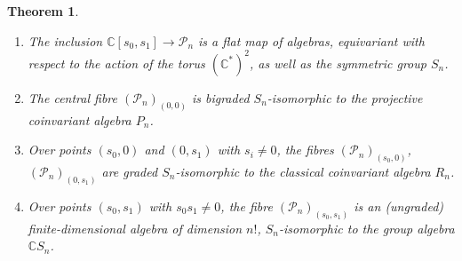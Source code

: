 \documentclass[10pt,a4paper]{amsart}
\newtheorem{theorem}{Theorem}
\newcommand{\C}{\mathbb{C}}
\newcommand{\CP}{\mathscr{P}}
\begin{document}
\begin{theorem}\label{thm_main_def}\begin{enumerate}
\item[(i)] The inclusion $\C[s_0, s_1]\rightarrow \CP_n$ is a flat map of algebras, equivariant with respect to the action of the torus $(\C^*)^2$, as well as the symmetric group $S_n$. 
\item[(ii)] The central fibre $(\CP_n)_{(0,0)}$ is bigraded $S_n$-isomorphic to the projective coinvariant algebra $P_n$. 
\item[(iii)] Over points $(s_0, 0)$ and $(0,s_1)$ with $s_i\neq 0$, the fibres $(\CP_n)_{(s_0,0)}$, $(\CP_n)_{(0,s_1)}$ are graded $S_n$-isomorphic to the classical coinvariant algebra $R_n$.
\item[(iv)] Over points $(s_0, s_1)$ with $s_0s_1\neq 0$, the fibre $(\CP_n)_{(s_0,s_1)}$ is an (ungraded) finite-dimensional algebra of dimension $n!$, $S_n$-isomorphic to the group algebra $\C S_n$. 
\end{enumerate}
\end{theorem}
\end{document}
